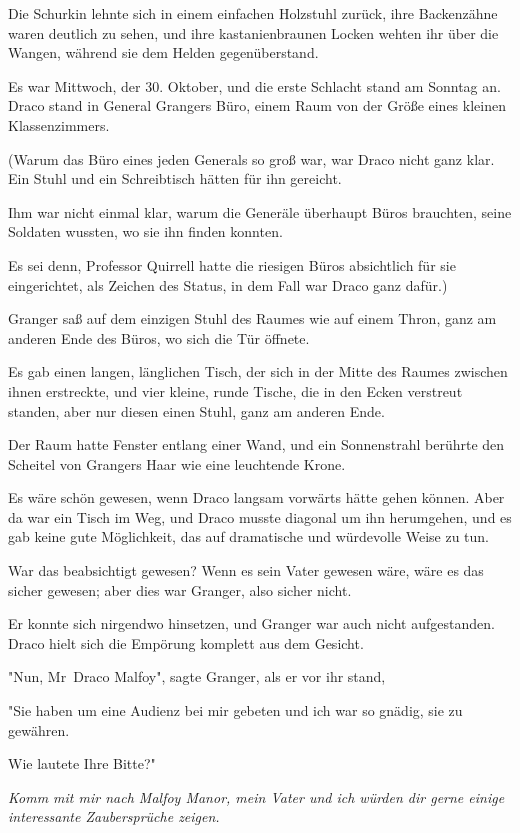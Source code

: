 {Die Schurkin lehnte sich in einem einfachen Holzstuhl zurück, ihre Backenzähne waren deutlich zu sehen, und ihre kastanienbraunen Locken wehten ihr über die Wangen, während sie dem Helden gegenüberstand.

Es war Mittwoch, der 30. Oktober, und die erste Schlacht stand am Sonntag an. Draco stand in General Grangers Büro, einem Raum von der Größe eines kleinen Klassenzimmers.

(Warum das Büro eines jeden Generals so groß war, war Draco nicht ganz klar. Ein Stuhl und ein Schreibtisch hätten für ihn gereicht.

Ihm war nicht einmal klar, warum die Generäle überhaupt Büros brauchten, seine Soldaten wussten, wo sie ihn finden konnten.

Es sei denn, Professor Quirrell hatte die riesigen Büros absichtlich für sie eingerichtet, als Zeichen des Status, in dem Fall war Draco ganz dafür.)

Granger saß auf dem einzigen Stuhl des Raumes wie auf einem Thron, ganz am anderen Ende des Büros, wo sich die Tür öffnete.

Es gab einen langen, länglichen Tisch, der sich in der Mitte des Raumes zwischen ihnen erstreckte, und vier kleine, runde Tische, die in den Ecken verstreut standen, aber nur diesen einen Stuhl, ganz am anderen Ende.

Der Raum hatte Fenster entlang einer Wand, und ein Sonnenstrahl berührte den Scheitel von Grangers Haar wie eine leuchtende Krone.

Es wäre schön gewesen, wenn Draco langsam vorwärts hätte gehen können. Aber da war ein Tisch im Weg, und Draco musste diagonal um ihn herumgehen, und es gab keine gute Möglichkeit, das auf dramatische und würdevolle Weise zu tun.

War das beabsichtigt gewesen? Wenn es sein Vater gewesen wäre, wäre es das sicher gewesen; aber dies war Granger, also sicher nicht.

Er konnte sich nirgendwo hinsetzen, und Granger war auch nicht aufgestanden. Draco hielt sich die Empörung komplett aus dem Gesicht.

"Nun, Mr~Draco Malfoy", sagte Granger, als er vor ihr stand,

"Sie haben um eine Audienz bei mir gebeten und ich war so gnädig, sie zu gewähren.

Wie lautete Ihre Bitte?"

\emph{Komm mit mir nach Malfoy Manor, mein Vater und ich würden dir gerne einige interessante Zaubersprüche zeigen.}

}
